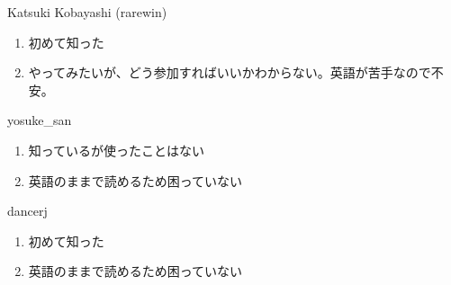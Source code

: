 \begin{prework}{ Katsuki Kobayashi (rarewin) }
  \begin{enumerate}
  \item 初めて知った
  \item やってみたいが、どう参加すればいいかわからない。英語が苦手なので不安。
  \end{enumerate}
\end{prework}

\begin{prework}{ yosuke\_san }
  \begin{enumerate}
  \item 知っているが使ったことはない
  \item 英語のままで読めるため困っていない
  \end{enumerate}
\end{prework}

\begin{prework}{ dancerj }
  \begin{enumerate}
  \item 初めて知った
  \item 英語のままで読めるため困っていない
  \end{enumerate}
\end{prework}

